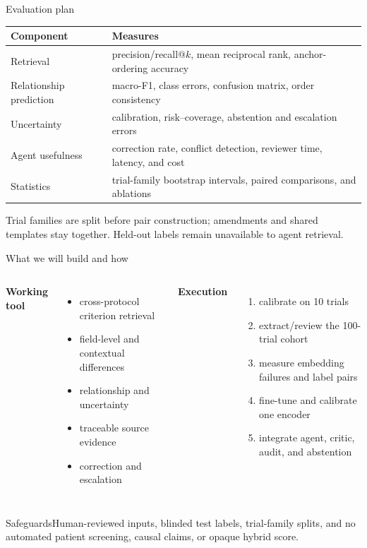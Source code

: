 \documentclass[aspectratio=169,10pt]{beamer}
\begin{document}
\begin{frame}{Evaluation plan}
\begin{tabularx}{\textwidth}{@{}p{}X@{}}\toprule Component & Measures \\\midrule
Retrieval & precision/recall@$k$, mean reciprocal rank, anchor-ordering accuracy \\
Relationship prediction & macro-F1, class errors, confusion matrix, order consistency \\
Uncertainty & calibration, risk--coverage, abstention and escalation errors \\
Agent usefulness & correction rate, conflict detection, reviewer time, latency, and cost \\
Statistics & trial-family bootstrap intervals, paired comparisons, and ablations \\\bottomrule\end{tabularx}
\vspace{.5em}Trial families are split before pair construction; amendments and shared templates stay together. Held-out labels remain unavailable to agent retrieval.
\end{frame}

\begin{frame}{What we will build and how}
\begin{columns}[T,onlytextwidth]\textbf{Working tool}
\begin{itemize}\item cross-protocol criterion retrieval\item field-level and contextual differences\item relationship and uncertainty\item traceable source evidence\item correction and escalation\end{itemize}
\textbf{Execution}
\begin{enumerate}\item calibrate on 10 trials\item extract/review the 100-trial cohort\item measure embedding failures and label pairs\item fine-tune and calibrate one encoder\item integrate agent, critic, audit, and abstention\end{enumerate}\end{columns}
\begin{block}{Safeguards}Human-reviewed inputs, blinded test labels, trial-family splits, and no automated patient screening, causal claims, or opaque hybrid score.\end{block}
\end{frame}
\end{document}

